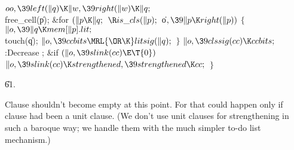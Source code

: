 ${}\\{oo},\39\\{left}(\|q)\K\|w,\39\\{right}(\|w)\K\|q;{}$\6
\\{free\_cell}(\|p);\6
\&{for} ${}(\|p\K\|q;{}$ ${}\R\\{is\_cls}(\|p);{}$ \|o${},\39\|p\K\\{right}(%
\|p)){}$\5
${}\{{}$\1\6
${}\|o,\39\|q\K\\{mem}[\|p].\\{lit};{}$\6
\\{touch}(\|q);\6
${}\|o,\39\\{ccbits}\MRL{{\OR}{\K}}\\{litsig}(\|q);{}$\6
\4${}\}{}$\2\6
${}\|o,\39\\{clssig}(\\{cc})\K\\{ccbits};{}$\6
:Decrease \X;\6
\&{if} ${}(\|o,\39\\{slink}(\\{cc})\E\T{0}){}$\1\5
${}\|o,\39\\{slink}(\\{cc})\K\\{strengthened},\39\\{strengthened}\K\\{cc};{}$\2%
\6
\4${}\}{}$\2\par
\U61.\fi

Clause  shouldn't become empty at this point.
For that could happen
only if clause  had been a unit clause. (We don't use unit clauses
for strengthening in such a baroque way; we handle them with
the much simpler to-do list mechanism.)

